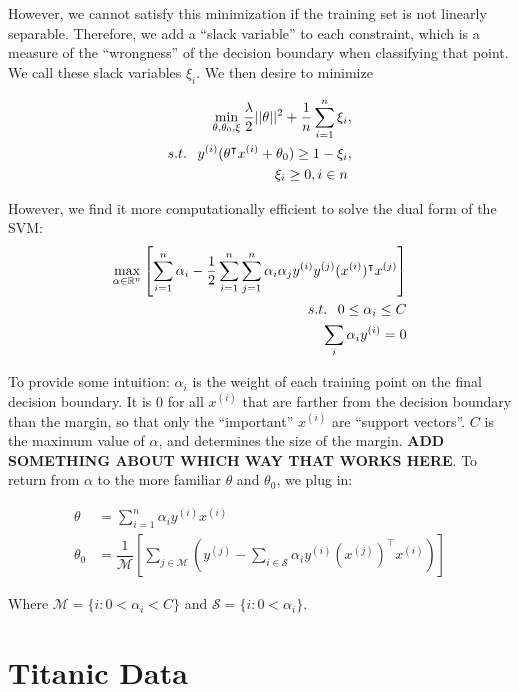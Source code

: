 \documentclass[10pt,letterpaper]{article}
\begin{document}
However, we cannot satisfy this minimization if the training set is not linearly separable. Therefore, we add a ``slack variable'' to each constraint, which is a measure of the ``wrongness'' of the decision boundary when classifying that point. We call these slack variables $\xi_i$. We then desire to minimize

\begin{align}
\min_{\theta, \theta_0, \xi} \dfrac{\lambda}{2} ||\theta||^2 + \dfrac{1}{n} \sum_{i=1}^{n} \xi_{i} &, \\
s.t. \hspace{.75em} y^{(i)}(\theta^\intercal x^{(i)} + \theta_0) \ge 1 - \xi_i &, \\
\xi_i \ge 0, i \in n &
\end{align}

However, we find it more computationally efficient to solve the dual form of the SVM:
\begin{align}
\max_{\alpha \in \mathbb{R}^n} \left[ \sum_{i=1}^n \alpha_i - \dfrac{1}{2} \sum_{i=1}^n \sum_{j=1}^n \alpha_i \alpha_j y^{(i)} y^{(j)} (x^{(i)})^\intercal x^{(j)}\right] & \\
s.t. \hspace{.75em} 0 \le \alpha_i \le C & \\
\sum_i \alpha_i y^{(i)} = 0 &
\end{align}

To provide some intuition: $\alpha_i$ is the weight of each training point on the final decision boundary. It is 0 for all $x^{(i)}$ that are farther from the decision boundary than the margin, so that only the ``important'' $x^{(i)}$ are ``support vectors''. $C$ is the maximum value of $\alpha$, and determines the size of the margin. \textbf{ADD SOMETHING ABOUT WHICH WAY THAT WORKS HERE}. To return from $\alpha$ to the more familiar $\theta$ and $\theta_0$, we plug in:

\begin{align}
\theta &= \sum_{i=1}^n \alpha_i y^{(i)} x^{(i)} \\
\theta_0 &= \dfrac{1}{\mathcal{M}} \left[ \sum_{j \in \mathcal{M}} \left( y^{(j)} - \sum_{i \in \mathcal{S}} \alpha_i y^{(i)} (x^{(j)})^\intercal x^{(i)} \right) \right]
\end{align}

Where $\mathcal{M} = \{ i : 0 < \alpha_i < C \}$ and $\mathcal{S} = \{ i : 0 < \alpha_i \}$.

\section{Titanic Data}
\end{document}
